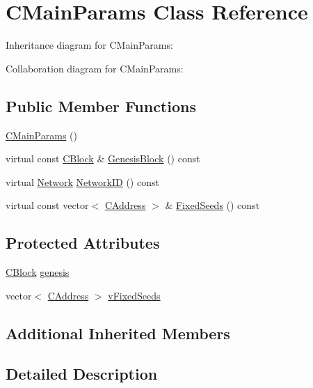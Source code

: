 \hypertarget{class_c_main_params}{}\section{C\+Main\+Params Class Reference}
\label{class_c_main_params}


Inheritance diagram for C\+Main\+Params\+:


Collaboration diagram for C\+Main\+Params\+:
\subsection*{Public Member Functions}
\begin{DoxyCompactItemize}
\item 
\hyperlink{class_c_main_params_ab7dfebf3c4dd5cc0ebdfabe1111056d6}{C\+Main\+Params} ()
\item 
virtual const \hyperlink{class_c_block}{C\+Block} \& \hyperlink{class_c_main_params_a43228dcc868204da9bf20d2cb308d7f6}{Genesis\+Block} () const 
\item 
virtual \hyperlink{class_c_chain_params_a5c4bb1d7c0205399ff06ee58fab7f176}{Network} \hyperlink{class_c_main_params_aa798a88a27d4fae9fd8a967cef56c207}{Network\+I\+D} () const 
\item 
virtual const vector$<$ \hyperlink{class_c_address}{C\+Address} $>$ \& \hyperlink{class_c_main_params_ae9e7774ee70930e733518296c7846d9b}{Fixed\+Seeds} () const 
\end{DoxyCompactItemize}
\subsection*{Protected Attributes}
\begin{DoxyCompactItemize}
\item 
\hyperlink{class_c_block}{C\+Block} \hyperlink{class_c_main_params_a820a707a8769ce6b71bb61cfc6982fa5}{genesis}
\item 
vector$<$ \hyperlink{class_c_address}{C\+Address} $>$ \hyperlink{class_c_main_params_a25f9a0aabc628c122817c1358da75c33}{v\+Fixed\+Seeds}
\end{DoxyCompactItemize}
\subsection*{Additional Inherited Members}


\subsection{Detailed Description}


